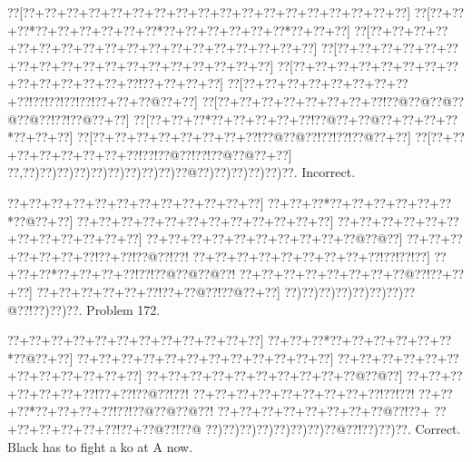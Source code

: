 \documentclass[a5paper]{article}
\begin{document}
\begin{center}
{\goo
\0??[\0??+\0??+\0??+\0??+\0??+\0??+\0??+\0??+\0??+\0??+\0??+\0??+\0??+\0??+\0??+\0??+\0??+\0??]
\0??[\0??+\0??+\0??*\0??+\0??+\0??+\0??+\0??+\0??*\0??+\0??+\0??+\0??+\0??+\0??*\0??+\0??+\0??]
\0??[\0??+\0??+\0??+\0??+\0??+\0??+\0??+\0??+\0??+\0??+\0??+\0??+\0??+\0??+\0??+\0??+\0??+\0??]
\0??[\0??+\0??+\0??+\0??+\0??+\0??+\0??+\0??+\0??+\0??+\0??+\0??+\0??+\0??+\0??+\0??+\0??+\0??]
\0??[\0??+\0??+\0??+\0??+\0??+\0??+\0??+\0??+\0??+\0??+\0??+\0??+\0??+\0??!\0??+\0??+\0??+\0??]
\0??[\0??+\0??+\0??+\0??+\0??+\0??+\0??+\0??+\0??!\0??!\0??!\0??!\0??!\0??+\0??+\0??@\0??+\0??]
\0??[\0??+\0??+\0??+\0??+\0??+\0??+\0??+\0??!\0??@\0??@\0??@\0??@\0??@\0??!\0??!\0??@\0??+\0??]
\0??[\0??+\0??+\0??*\0??+\0??+\0??+\0??+\0??!\0??@\0??+\0??@\0??+\0??+\0??+\0??*\0??+\0??+\0??]
\0??[\0??+\0??+\0??+\0??+\0??+\0??+\0??+\0??!\0??@\0??@\0??!\0??!\0??!\0??@\0??+\0??]
\0??[\0??+\0??+\0??+\0??+\0??+\0??+\0??+\0??!\0??!\0??@\0??!\0??!\0??@\0??@\0??+\0??]
\0??,\0??)\0??)\0??)\0??)\0??)\0??)\0??)\0??)\0??)\0??@\0??)\0??)\0??)\0??)\0??)\0??.
}
Incorrect. 

\end{center}
\newpage
\begin{center}
{\goo
\0??+\0??+\0??+\0??+\0??+\0??+\0??+\0??+\0??+\0??+\0??+\0??]
\0??+\0??+\0??*\0??+\0??+\0??+\0??+\0??+\0??*\0??@\0??+\0??]
\0??+\0??+\0??+\0??+\0??+\0??+\0??+\0??+\0??+\0??+\0??+\0??]
\0??+\0??+\0??+\0??+\0??+\0??+\0??+\0??+\0??+\0??+\0??+\0??]
\0??+\0??+\0??+\0??+\0??+\0??+\0??+\0??+\0??+\0??@\0??@\0??]
\0??+\0??+\0??+\0??+\0??+\0??+\0??!\0??+\0??!\0??@\0??!\0??!
\0??+\0??+\0??+\0??+\0??+\0??+\0??+\0??+\0??!\0??!\0??!\0??]
\0??+\0??+\0??*\0??+\0??+\0??+\0??!\0??!\0??@\0??@\0??@\0??!
\0??+\0??+\0??+\0??+\0??+\0??+\0??+\0??@\0??!\0??+\0??+\0??]
\0??+\0??+\0??+\0??+\0??+\0??!\0??+\0??@\0??!\0??@\0??+\0??]
\0??)\0??)\0??)\0??)\0??)\0??)\0??)\0??@\0??!\0??)\0??)\0??.
}
Problem 172.

\end{center}
\begin{center}
{\goo
\0??+\0??+\0??+\0??+\0??+\0??+\0??+\0??+\0??+\0??+\0??+\0??]
\0??+\0??+\0??*\0??+\0??+\0??+\0??+\0??+\0??*\0??@\0??+\0??]
\0??+\0??+\0??+\0??+\0??+\0??+\0??+\0??+\0??+\0??+\0??+\0??]
\0??+\0??+\0??+\0??+\0??+\0??+\0??+\0??+\0??+\0??+\0??+\0??]
\0??+\0??+\0??+\0??+\0??+\0??+\0??+\0??+\0??+\0??@\0??@\0??]
\0??+\0??+\0??+\0??+\0??+\0??+\0??!\0??+\0??!\0??@\0??!\0??!
\0??+\0??+\0??+\0??+\0??+\0??+\0??+\0??+\0??!\0??!\0??!
\0??+\0??+\0??*\0??+\0??+\0??+\0??!\0??!\0??@\0??@\0??@\0??!
\0??+\0??+\0??+\0??+\0??+\0??+\0??+\0??@\0??!\0??+
\0??+\0??+\0??+\0??+\0??+\0??!\0??+\0??@\0??!\0??@
\0??)\0??)\0??)\0??)\0??)\0??)\0??)\0??@\0??!\0??)\0??)\0??.
}
Correct. Black has to fight a ko at A now.

\end{center}
\end{document}
